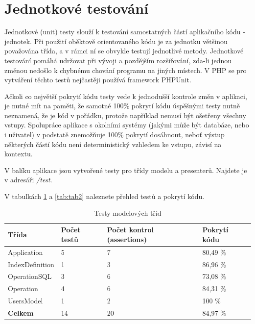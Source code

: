 \documentclass[11pt,twoside,a4paper]{book}
\begin{document}
\section{Jednotkové testování}
Jednotkové (unit) testy slouží k testování samostatných částí aplikačního kódu - jednotek. Při použití oběktově orientovaného kódu je za jednotku většinou považována třída, a v rámci ní se obvykle testují jednotlivé metody. Jednotkové testování pomáhá udržovat při vývoji a pozdějším rozšiřování, zda-li jednou změnou nedošlo k chybnému chování programu na jiných místech. V PHP se pro vytváření těchto testů nejčastěji používá framework PHPUnit\cite{phpunit}.

Ačkoli co největší pokrytí kódu testy vede k jednodušší kontrole změn v aplikaci, je nutné mít na paměti, že samotné 100\% pokrytí kódu úspěšnými testy nutně neznamená, že je kód v pořádku, protože například nemusí být ošetřeny všechny vstupy. Spolupráce aplikace s okolními systémy (jakými může být databáze, nebo i uživatel) v podstatě znemožňuje 100\% pokrytí dosáhnout, neboť výstup některých částí kódu není deterministický vzhledem ke vstupu, závisí na kontextu.

V balíku aplikace jsou vytvořené testy pro třídy modelu a presenterů. Najdete je v adresáři \textit{/test}.

V tabulkách  \ref{tab:tab1} a \ref{tab:tab2} naleznete přehled testů a pokrytí kódu.

\begin{table}
\begin{center}
\begin{tabular}{|l|l|l|l|}
\hline
\textbf{Třída} & \textbf{Počet testů} & \textbf{Počet kontrol (assertions)} & \textbf{Pokrytí kódu} \\
\hline
\hline
Application & 5 & 7 & 80,49 \% \\
\hline
IndexDefinition & 1 & 3 & 86,96 \% \\
\hline
OperationSQL & 3 & 6 & 73,08 \% \\
\hline
Operation & 4 & 6 & 84,31 \% \\
\hline
UsersModel & 1 & 2 & 100 \% \\
\hline
\textbf{Celkem} & 14 & 20 & 84,97 \% \\
\hline
\end{tabular}
\end{center}
\caption{Testy modelových tříd}
\label{tab:tab1}
\end{table}
\end{document}
